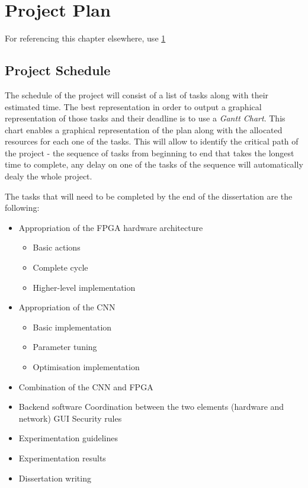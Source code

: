 \chapter{Project Plan}

\label{Chapter5} For referencing this chapter elsewhere, use \ref{Chapter5}



\section{Project Schedule}

The schedule of the project will consist of a list of tasks along with their estimated time. The best representation in order to output a graphical representation of those tasks and their deadline is to use a \emph{Gantt Chart}. This chart enables a graphical representation of the plan along with the allocated resources for each one of the tasks. This will allow to identify the critical path of the project - the sequence of tasks from beginning to end that takes the longest time to complete, any delay on one of the tasks of the sequence will automatically dealy the whole project.

The tasks that will need to be completed by the end of the dissertation are the following:

\begin{itemize}
  \item Appropriation of the FPGA hardware architecture
  \begin{itemize}
    \item Basic actions
    \item Complete cycle
    \item Higher-level implementation
  \end{itemize}
  \item Appropriation of the CNN
  \begin{itemize}
    \item Basic implementation
    \item Parameter tuning
    \item Optimisation implementation
  \end{itemize}
  \item Combination of the CNN and FPGA
  \item Backend software
    Coordination between the two elements (hardware and network)
    GUI
    Security rules
  \item Experimentation guidelines
  \item Experimentation results
  \item Dissertation writing
\end{itemize}

